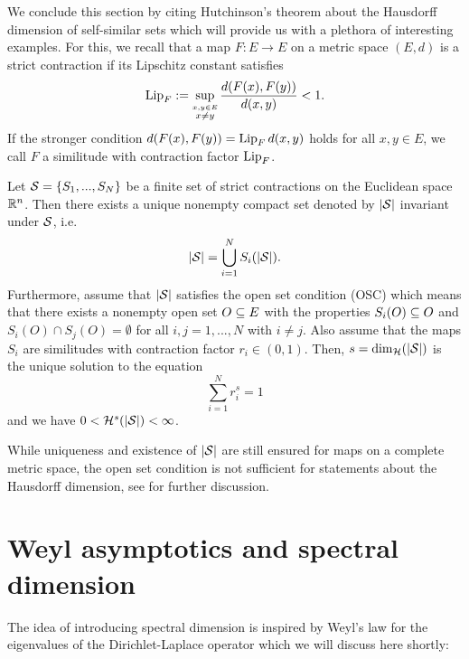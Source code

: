 We conclude this section by citing Hutchinson's theorem about the Hausdorff dimension of self-similar sets which will provide us with a plethora of interesting examples. For this, we recall that a map $F:E\to E$ on a metric space $(E,d)$ is a strict contraction if its Lipschitz constant satisfies
\[
  \operatorname{Lip}_F:=\sup_{\stackrel{x,y\in E}{x\neq y}}\frac{d(F(x),F(y))}{d(x,y)}<1.
\]
If the stronger condition $d(F(x),F(y))=\operatorname{Lip}_F d(x,y)$ holds for all $x,y\in E$, we call $F$ a similitude with contraction factor $\operatorname{Lip}_F$.
\begin{thm}\label{thm:hutchinson}
  Let $\mathcal{S}=\{S_1,...,S_N\}$ be a finite set of strict contractions on the Euclidean space $\mathbb{R}^n$. Then there exists a unique nonempty compact set denoted by $|\mathcal{S}|$ invariant under $\mathcal{S}$, i.e.
  \[
    |\mathcal{S}|=\bigcup_{i=1}^N S_i(|\mathcal{S}|).
  \]
  Furthermore, assume that $|\mathcal{S}|$ satisfies the open set condition (OSC) which means that there exists a nonempty open set $O\subseteq E$ with the properties $S_i(O)\subseteq O$ and $S_i(O)\cap S_j(O)=\emptyset$ for all $i,j=1,...,N$ with $i\neq j$. Also assume that the maps $S_i$ are similitudes with contraction factor $r_i\in(0,1)$. Then, $s=\dim_{\mathcal{H}}(|\mathcal{S}|)$ is the unique solution to the equation
  \[
    \sum_{i=1}^N r_i^s=1
  \]
  and we have $0<\mathcal{H}^s(|\mathcal{S}|)<\infty$. 
\end{thm}
While uniqueness and existence of $|\mathcal{S}|$ are still ensured for maps on a complete metric space, the open set condition is not sufficient for statements about the Hausdorff dimension, see \cite{schief1996self} for further discussion. 



\section{Weyl asymptotics and spectral dimension}

The idea of introducing spectral dimension is inspired by Weyl's law for the eigenvalues of the Dirichlet-Laplace operator which we will discuss here shortly:

